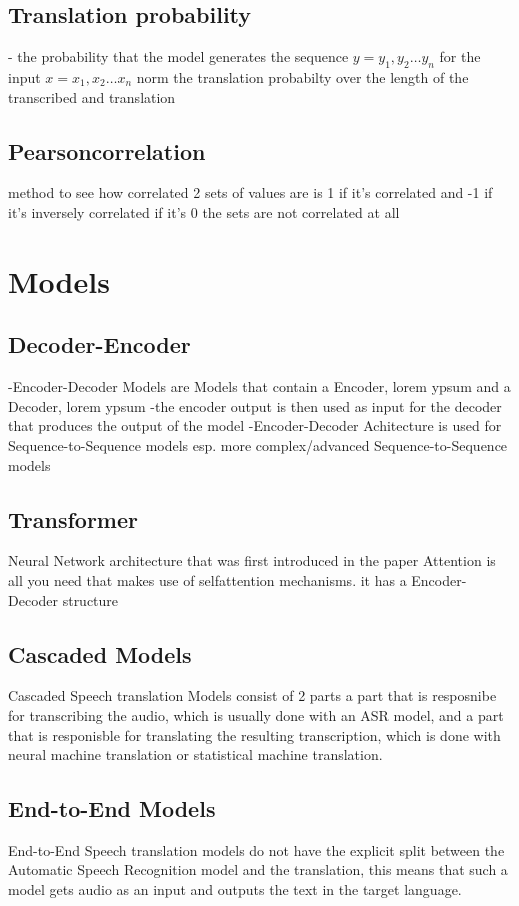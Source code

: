 \subsection{Translation probability}
- the probability that the model generates the sequence $y = y_1, y_2 \dots y_n$ for the input $x=x_1, x_2 \dots x_n$
norm the translation probabilty over the length of the transcribed and translation 
\subsection{Pearsoncorrelation}
method to see how correlated 2 sets of values are
is 1 if it's correlated and -1 if it's inversely correlated 
if it's 0 the sets are not correlated at all

\section{Models}
\subsection{Decoder-Encoder}
-Encoder-Decoder Models are Models that contain a Encoder, lorem ypsum 
and a Decoder, lorem ypsum
-the encoder output is then used as input for the decoder that produces the output of the model 
-Encoder-Decoder Achitecture is used for Sequence-to-Sequence models esp. more complex/advanced Sequence-to-Sequence models 

\subsection{Transformer}
Neural Network architecture that was first introduced in the paper Attention is all you need \cite{vaswani2023attentionneed} that makes use of selfattention mechanisms. it has a Encoder-Decoder structure

\subsection{ Cascaded Models}
Cascaded Speech translation Models consist of 2 parts a part that is resposnibe for transcribing the audio, which is usually done with an ASR model, and a part that is responisble for translating the resulting transcription, which is done with neural machine translation or statistical machine translation. 
\subsection{End-to-End Models}
End-to-End Speech translation models do not have the explicit split between the Automatic Speech Recognition model and the translation, this means that such a model gets audio as an input and outputs the text in the target language. 
